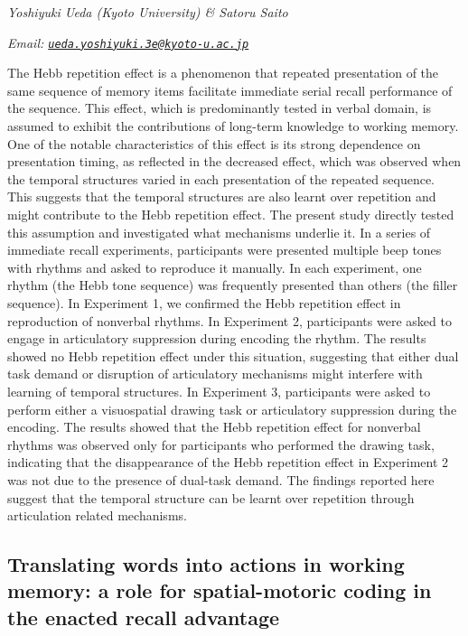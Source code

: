 \documentclass[
  12pt,
]{book}
\begin{document}
\emph{Yoshiyuki Ueda (Kyoto University) \& Satoru Saito}

\emph{Email: \href{mailto:ueda.yoshiyuki.3e@kyoto-u.ac.jp}{\nolinkurl{ueda.yoshiyuki.3e@kyoto-u.ac.jp}}}

The Hebb repetition effect is a phenomenon that repeated presentation of the same sequence of memory items facilitate immediate serial recall performance of the sequence. This effect, which is predominantly tested in verbal domain, is assumed to exhibit the contributions of long-term knowledge to working memory. One of the notable characteristics of this effect is its strong dependence on presentation timing, as reflected in the decreased effect, which was observed when the temporal structures varied in each presentation of the repeated sequence. This suggests that the temporal structures are also learnt over repetition and might contribute to the Hebb repetition effect. The present study directly tested this assumption and investigated what mechanisms underlie it. In a series of immediate recall experiments, participants were presented multiple beep tones with rhythms and asked to reproduce it manually. In each experiment, one rhythm (the Hebb tone sequence) was frequently presented than others (the filler sequence). In Experiment 1, we confirmed the Hebb repetition effect in reproduction of nonverbal rhythms. In Experiment 2, participants were asked to engage in articulatory suppression during encoding the rhythm. The results showed no Hebb repetition effect under this situation, suggesting that either dual task demand or disruption of articulatory mechanisms might interfere with learning of temporal structures. In Experiment 3, participants were asked to perform either a visuospatial drawing task or articulatory suppression during the encoding. The results showed that the Hebb repetition effect for nonverbal rhythms was observed only for participants who performed the drawing task, indicating that the disappearance of the Hebb repetition effect in Experiment 2 was not due to the presence of dual-task demand. The findings reported here suggest that the temporal structure can be learnt over repetition through articulation related mechanisms.

\hypertarget{translating-words-into-actions-in-working-memory-a-role-for-spatial-motoric-coding-in-the-enacted-recall-advantage}{%
\subsection{Translating words into actions in working memory: a role for spatial-motoric coding in the enacted recall advantage}\label{translating-words-into-actions-in-working-memory-a-role-for-spatial-motoric-coding-in-the-enacted-recall-advantage}}
\end{document}
